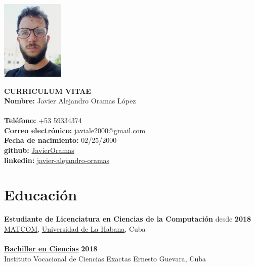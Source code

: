 \documentclass{article}
\begin{document}
\pagestyle{empty} %

\begin{center}
\begin{minipage}[t]{0.2\textwidth}
\vspace{0pt}
\includegraphics[width=3cm]{img.png}
\end{minipage}
\hspace{1cm}
\begin{minipage}[t]{0.7\textwidth}
\vspace{0pt}
\textbf{CURRICULUM VITAE}\\
\textbf{Nombre:} Javier Alejandro Oramas López\\
\\
\textbf{Teléfono:} +53 59334374 \\
\textbf{Correo electrónico:} javiale2000@gmail.com \\
\textbf{Fecha de nacimiento:} 02/25/2000\\
\textbf{github:} \href{https://github.com/JavierOramas}{JavierOramas} \\
\textbf{linkedin:} \href{https://www.linkedin.com/in/javier-alejandro-oramas-l%C3%B3pez-7ab47b160/}{javier-alejandro-oramas} \\
\end{minipage}
\end{center}

\section*{Educación}
\textbf{Estudiante de Licenciatura en Ciencias de la Computación} \hfill desde \textbf{2018}\\
\href{https://matcom.in/}{MATCOM}, \href{https://uh.cu}{Universidad de La Habana}, Cuba\\
\vspace{0.1cm}\\
\textbf{\hyperref[sec:bachelor]{Bachiller en Ciencias}} \hfill \textbf{2018}\\
Instituto Vocacional de Ciencias Exactas Ernesto Guevara, Cuba
\end{document}
